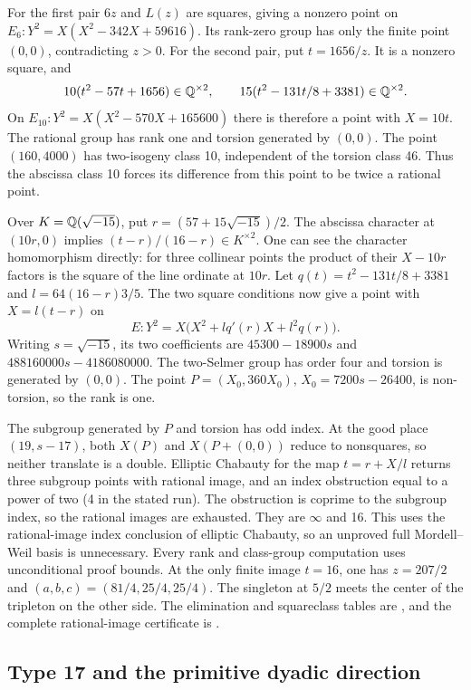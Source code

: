 For the first pair $6z$ and $L(z)$ are squares, giving a nonzero
point on
$E_6:Y^2=X(X^2-342X+59616)$. Its rank-zero group has only the
finite point $(0,0)$, contradicting $z>0$.
For the second pair, put $t=1656/z$. It is a nonzero square, and
\[
 10(t^2-57t+1656)\in\mathbb Q^{\times2},\qquad
 15(t^2-131t/8+3381)\in\mathbb Q^{\times2}.
\]
On $E_{10}:Y^2=X(X^2-570X+165600)$ there is therefore a point
with $X=10t$. The rational group has rank one and torsion generated
by $(0,0)$. The point $(160,4000)$ has two-isogeny class 10,
independent of the torsion class 46. Thus the abscissa class 10
forces its difference from this point to be twice a rational point.

Over $K=\mathbb Q(\sqrt{-15})$, put
$r=(57+15\sqrt{-15})/2$. The abscissa character at $(10r,0)$
implies $(t-r)/(16-r)\in K^{\times2}$. One can see the character
homomorphism directly: for three collinear points the product of
their $X-10r$ factors is the square of the line ordinate at $10r$.
Let $q(t)=t^2-131t/8+3381$ and $l=64(16-r)3/5$.
The two square conditions now give a point with $X=l(t-r)$ on
\[
 E:Y^2=X\bigl(X^2+lq'(r)X+l^2q(r)\bigr).
\]
Writing $s=\sqrt{-15}$, its two coefficients are
$45300-18900s$ and $488160000s-4186080000$.
The two-Selmer group has order four and torsion is generated by
$(0,0)$. The point $P=(X_0,360X_0)$,
$X_0=7200s-26400$, is non-torsion, so the rank is one.

The subgroup generated by $P$ and torsion has odd index. At the
good place $(19,s-17)$, both $X(P)$ and $X(P+(0,0))$ reduce to
nonsquares, so neither translate is a double. Elliptic Chabauty for
the map $t=r+X/l$ returns three subgroup points with rational
image, and an index obstruction equal to a power of two (4 in the
stated run). The obstruction is coprime to the subgroup index, so
the rational images are exhausted. They are $\infty$ and 16.
This uses the rational-image index conclusion of elliptic Chabauty,
so an unproved full Mordell--Weil basis is unnecessary.
Every rank and class-group computation uses unconditional proof
bounds. At the only finite image $t=16$, one has
$z=207/2$ and $(a,b,c)=(81/4,25/4,25/4)$. The singleton at
$5/2$ meets the center of the tripleton on the other side.
The elimination and squareclass tables are
, and the complete rational-image
certificate is .

\subsection{Type 17 and the primitive dyadic direction}\label{app:type17-details}

